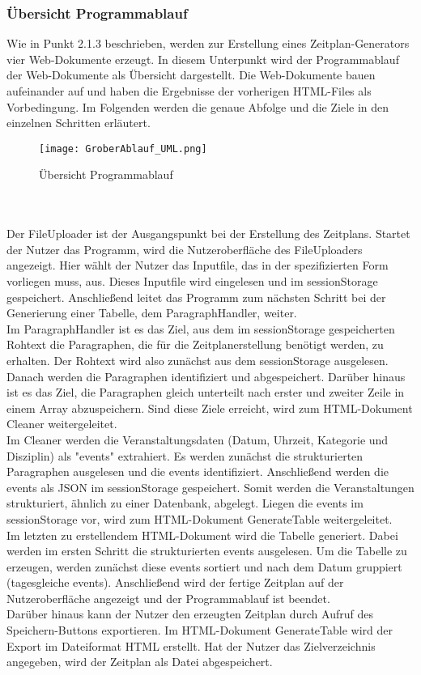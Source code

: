 \subsubsection{Übersicht Programmablauf}
Wie in Punkt 2.1.3 beschrieben, werden zur Erstellung eines Zeitplan-Generators vier Web-Dokumente erzeugt. In diesem Unterpunkt wird der Programmablauf der Web-Dokumente als Übersicht dargestellt.
Die Web-Dokumente bauen aufeinander auf und haben die Ergebnisse der vorherigen HTML-Files als Vorbedingung. Im Folgenden werden die genaue Abfolge und die Ziele in den einzelnen Schritten erläutert.
\begin{figure}[htbp]
  \centering
  \texttt{[image: GroberAblauf\_UML.png]}
  \caption{Übersicht Programmablauf}
  \label{fig:Fig1}
\end{figure} \\
\\
Der FileUploader ist der Ausgangspunkt bei der Erstellung des Zeitplans. Startet der Nutzer das Programm, wird die Nutzeroberfläche des FileUploaders angezeigt. Hier wählt der Nutzer das Inputfile, das in der spezifizierten Form vorliegen muss, aus. Dieses Inputfile wird eingelesen und im sessionStorage gespeichert. Anschließend leitet das Programm zum nächsten Schritt bei der Generierung einer Tabelle, dem ParagraphHandler, weiter.\\
Im ParagraphHandler ist es das Ziel, aus dem im sessionStorage gespeicherten Rohtext die Paragraphen, die für die Zeitplanerstellung benötigt werden, zu erhalten. Der Rohtext wird also zunächst aus dem sessionStorage ausgelesen. Danach werden die Paragraphen identifiziert und abgespeichert. Darüber hinaus ist es das Ziel, die Paragraphen gleich unterteilt nach erster und zweiter Zeile in einem Array abzuspeichern. Sind diese Ziele erreicht, wird zum HTML-Dokument Cleaner weitergeleitet.\\
Im Cleaner werden die Veranstaltungsdaten (Datum, Uhrzeit, Kategorie und Disziplin) als "events" extrahiert. Es werden zunächst die strukturierten Paragraphen ausgelesen und die events identifiziert. Anschließend werden die events als JSON im sessionStorage gespeichert. Somit werden die Veranstaltungen strukturiert, ähnlich zu einer Datenbank, abgelegt. Liegen die events im sessionStorage vor, wird zum HTML-Dokument GenerateTable weitergeleitet.\\
Im letzten zu erstellendem HTML-Dokument wird die Tabelle generiert. Dabei werden im ersten Schritt die strukturierten events ausgelesen. Um die Tabelle zu erzeugen, werden zunächst diese events sortiert und nach dem Datum gruppiert (tagesgleiche events). Anschließend wird der fertige Zeitplan auf der Nutzeroberfläche angezeigt und der Programmablauf ist beendet.\\
Darüber hinaus kann der Nutzer den erzeugten Zeitplan durch Aufruf des Speichern-Buttons exportieren. Im HTML-Dokument GenerateTable wird der Export im Dateiformat HTML erstellt. Hat der Nutzer das Zielverzeichnis angegeben, wird der Zeitplan als Datei abgespeichert.
 
